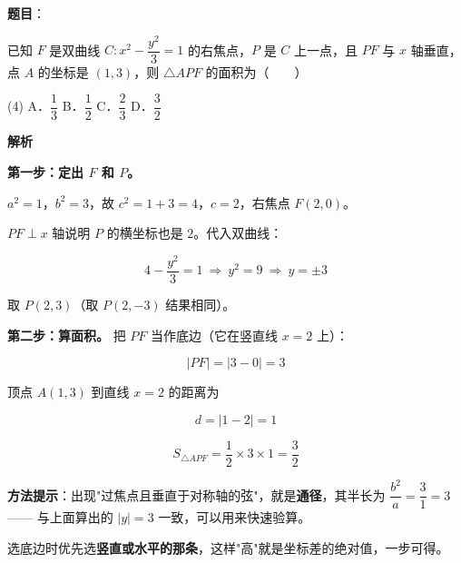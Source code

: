 \begin{answer}

\textbf{题目}：

已知 $F$ 是双曲线 $C:x^{2}-\dfrac{y^{2}}3=1$ 的右焦点，$P$ 是 $C$ 上一点，且 $PF$ 与 $x$ 轴垂直，点 $A$ 的坐标是 $(1,3)$，则 $\triangle APF$ 的面积为\mbox{（　　）}

\begin{gkopts}(4)
\task A．$\dfrac13$
\task B．$\dfrac12$
\task C．$\dfrac23$
\task D．$\dfrac32$
\end{gkopts}

\textbf{解析}

\textbf{第一步：定出 $F$ 和 $P$。}

$a^{2}=1$，$b^{2}=3$，故 $c^{2}=1+3=4$，$c=2$，右焦点 $F(2,0)$。

$PF\perp x$ 轴说明 $P$ 的横坐标也是 $2$。代入双曲线：

\nopagebreak[4]
\[4-\frac{y^{2}}3=1\ \Longrightarrow\ y^{2}=9\ \Longrightarrow\ y=\pm3\]

取 $P(2,3)$（取 $P(2,-3)$ 结果相同）。

\textbf{第二步：算面积。} 把 $PF$ 当作底边（它在竖直线 $x=2$ 上）：

\nopagebreak[4]
\[|PF|=|3-0|=3\]

顶点 $A(1,3)$ 到直线 $x=2$ 的距离为

\nopagebreak[4]
\[d=|1-2|=1\]

\nopagebreak[4]
\[S_{\triangle APF}=\frac12\times3\times1=\frac32\]

\begin{gktip}
\textbf{方法提示}：出现"过焦点且垂直于对称轴的弦"，就是\textbf{通径}，其半长为 $\dfrac{b^{2}}a=\dfrac31=3$ —— 与上面算出的 $|y|=3$ 一致，可以用来快速验算。

选底边时优先选\textbf{竖直或水平的那条}，这样"高"就是坐标差的绝对值，一步可得。
\end{gktip}


\par\medskip

\end{answer}
